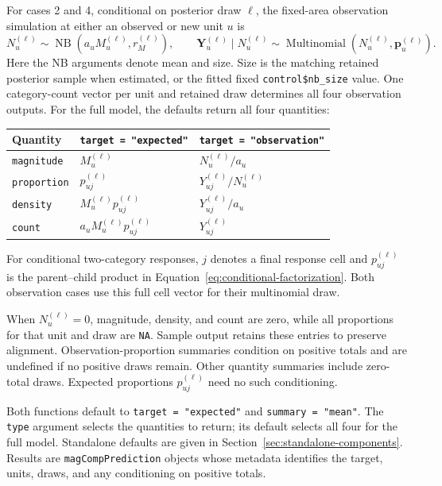 \documentclass[11pt]{article}
\newcommand{\bp}{\bm{p}}
\begin{document}
For cases 2 and 4, conditional on posterior draw \(\ell\), the fixed-area
observation simulation at either an observed or new unit \(u\) is
\begin{equation}
  N_u^{(\ell)} \sim \operatorname{NB}\!\left(a_uM_u^{(\ell)},r_M^{(\ell)}\right),
  \qquad
  \mathbf{Y}_u^{(\ell)}\mid N_u^{(\ell)}
    \sim \operatorname{Multinomial}\!\left(N_u^{(\ell)},\bp_u^{(\ell)}\right).
  \label{eq:prediction-observation}
\end{equation}
Here the NB arguments denote mean and size. Size is the matching retained
posterior sample when estimated, or the fitted fixed
\texttt{control\$nb\_size} value.
One category-count vector per unit and retained draw determines all four
observation outputs. For the full model, the defaults return all four quantities:
\begin{center}
\begin{tabular}{lll}
\toprule
Quantity & \texttt{target = "expected"} & \texttt{target = "observation"} \\
\midrule
\texttt{magnitude} & \(M_u^{(\ell)}\) & \(N_u^{(\ell)}/a_u\) \\
\texttt{proportion} & \(p_{uj}^{(\ell)}\) & \(Y_{uj}^{(\ell)}/N_u^{(\ell)}\) \\
\texttt{density} & \(M_u^{(\ell)}p_{uj}^{(\ell)}\) & \(Y_{uj}^{(\ell)}/a_u\) \\
\texttt{count} & \(a_uM_u^{(\ell)}p_{uj}^{(\ell)}\) & \(Y_{uj}^{(\ell)}\) \\
\bottomrule
\end{tabular}
\end{center}
For conditional two-category responses, \(j\) denotes a final response cell
and \(p_{uj}^{(\ell)}\) is the parent--child product in
Equation~\ref{eq:conditional-factorization}. Both observation cases use this full
cell vector for their multinomial draw.

When \(N_u^{(\ell)}=0\), magnitude, density, and count are zero, while all
proportions for that unit and draw are \texttt{NA}. Sample output retains
these entries to preserve alignment. Observation-proportion summaries
condition on positive totals and are undefined if no positive draws remain.
Other quantity summaries include zero-total draws. Expected proportions
\(p_{uj}^{(\ell)}\) need no such conditioning.

Both functions default to \texttt{target = "expected"} and
\texttt{summary = "mean"}. The \texttt{type} argument selects the quantities
to return; its default selects all four for the full model. Standalone defaults
are given in Section~\ref{sec:standalone-components}.
Results are \texttt{magCompPrediction} objects whose metadata identifies the
target, units, draws, and any conditioning on positive totals.
\end{document}
